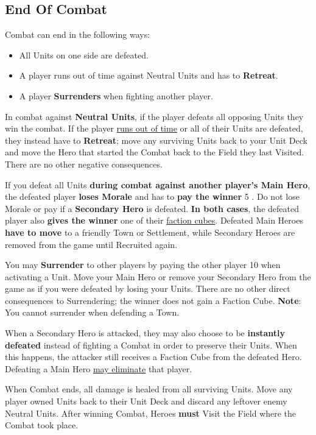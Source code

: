 \subsection*{\hypertarget{Endcombat}{End Of Combat}}
Combat can end in the following ways:
\begin{itemize}
    \item All Units on one side are defeated.
    \item A player runs out of time against Neutral Units and has to \textbf{Retreat}.
    \item A player \textbf{Surrenders} when fighting another player.
\end{itemize}
In combat against \textbf{Neutral Units}, if the player defeats all opposing Units they win the combat.
If the player \hyperlink{Timelimit}{runs out of time} or all of their Units are defeated, they instead have to \textbf{Retreat}; move any surviving Units back to your Unit Deck and move the Hero that started the Combat back to the Field they last Visited.
There are no other negative consequences.\par
If you defeat all Units \textbf{during combat against another player's Main Hero}, the defeated player \textbf{loses Morale} and has to \textbf{pay the winner} 5 .
Do not lose Morale or pay  if a \textbf{Secondary Hero} is defeated.
\textbf{In both cases}, the defeated player also \textbf{gives the winner} one of their \hyperlink{End}{faction cubes}.
Defeated Main Heroes \textbf{have to move} to a friendly Town or Settlement, while Secondary Heroes are removed from the game until Recruited again.\par
You may \textbf{Surrender} to other players by paying the other player 10  when activating a Unit.
Move your Main Hero or remove your Secondary Hero from the game as if you were defeated by losing your Units.
There are no other direct consequences to Surrendering; the winner does not gain a Faction Cube.
\textbf{Note}: You cannot surrender when defending a Town.\par
When a Secondary Hero is attacked, they may also choose to be \textbf{instantly defeated} instead of fighting a Combat in order to preserve their Units.
When this happens, the attacker still receives a Faction Cube from the defeated Hero.
Defeating a Main Hero \hyperlink{End}{may eliminate} that player.\par
When Combat ends, all damage is healed from all surviving Units.
Move any player owned Units back to their Unit Deck and discard any leftover enemy Neutral Units.
After winning Combat, Heroes \textbf{must} Visit the Field where the Combat took place.

